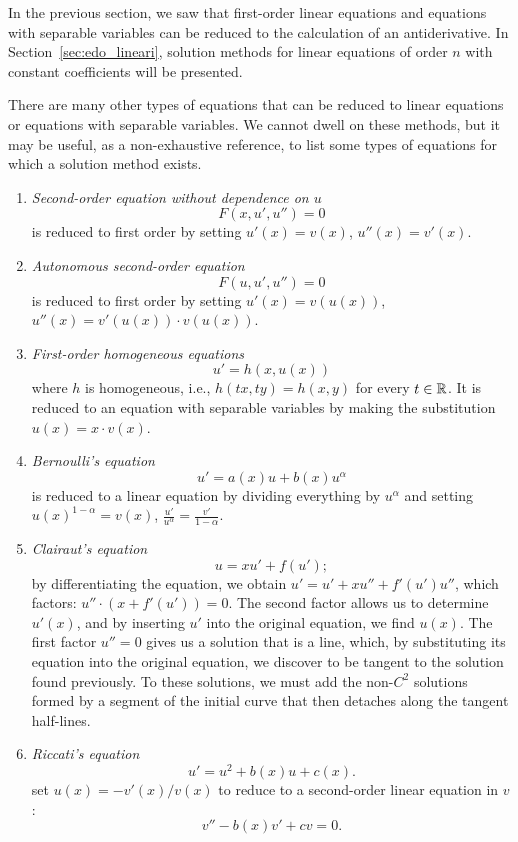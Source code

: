 In the previous section, we saw that first-order linear equations and equations
with separable variables can be reduced to the calculation of an antiderivative.
In Section~\ref{sec:edo_lineari}, solution methods for linear equations of order
$n$ with constant coefficients will be presented.

There are many other types of equations that can be reduced to linear equations
or equations with separable variables.
We cannot dwell on these methods, but it may be useful, as a non-exhaustive
reference, to list some types of equations for which a solution method exists.

\begin{enumerate}
\item \emph{Second-order equation without dependence on $u$}
\[
  F(x, u', u'') = 0
\]
is reduced to first order by setting $u'(x) = v(x)$, $u''(x) = v'(x)$.

\item \emph{Autonomous second-order equation}
\[
  F(u, u', u'') = 0
\]
is reduced to first order by setting $u'(x) = v(u(x))$, $u''(x) = v'(u(x))\cdot
v(u(x))$.

\item \emph{First-order homogeneous equations}
%
\[
  u' = h(x,u(x))
\]
where $h$ is homogeneous, i.e., $h(tx,ty)=h(x,y)$ for every $t\in {\mathbb R}$.
It is reduced to an equation with separable variables by making the substitution
$u(x) = x\cdot v(x)$.

\item \emph{Bernoulli's equation}
%
%
\[
  u' = a(x) u + b(x) u^\alpha
\]
is reduced to a linear equation by dividing everything by $u^\alpha$ and setting
$u(x)^{1-\alpha} = v(x)$, $\frac{u'}{u^\alpha} = \frac{v'}{1-\alpha}$.

\item \emph{Clairaut's equation}
%
%
\[
  u = x u' + f(u');
\]
by differentiating the equation, we obtain $ u' = u' + xu'' + f'(u')u''$, which
factors: $u''\cdot(x+f'(u'))=0$.
The second factor allows us to determine $u'(x)$, and by inserting $u'$ into the
original equation, we find $u(x)$.
The first factor $u''=0$ gives us a solution that is a line, which, by
substituting its equation into the original equation, we discover to be tangent
to the solution found previously.
To these solutions, we must add the non-$C^2$ solutions formed by a segment of
the initial curve that then detaches along the tangent half-lines.

\item \emph{Riccati's equation}
%
%
\[
  u' = u^2 + b(x) u + c(x).
\]
set $u(x) = -v'(x)/v(x)$ to reduce to a second-order linear equation in $v$:
\[
 v'' -  b(x) v' + c v = 0.
\]
\end{enumerate}


